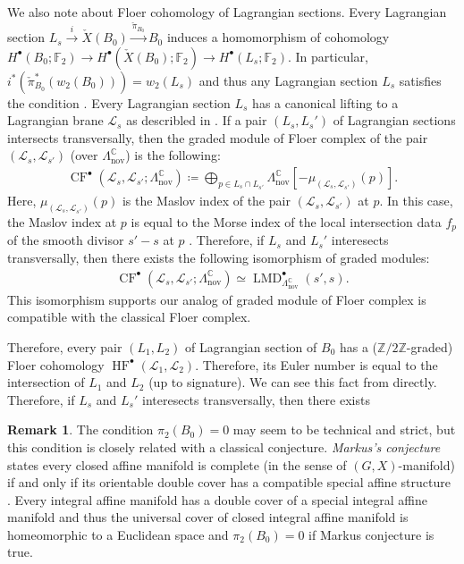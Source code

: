 \documentclass[a4paper,dvipdfmx,reqno,12pt]{amsart}
\makeatletter
\newcommand{\ind}[2]{\emph{#1}\index{1{#2}@{#1}}}
\theoremstyle{definition}
\newtheorem{remark}[theorem]{Remark}
\newcommand{\deq}{\coloneqq}
\newcommand{\opn}[1]{\operatorname{#1}}
\newcommand{\xto}[1]{\xrightarrow{#1}}
\numberwithin{equation}{section}
\makeatother
\begin{document}
We also note about Floer cohomology of 
Lagrangian sections.
Every Lagrangian section
$L_s\xto{i} \check{X}(B_0)\xto{\check{\pi}_{B_0}}  B_0$
induces a homomorphism of 
cohomology 
$H^{\bullet}(B_0;\mathbb{F}_2)\to 
H^{\bullet}(\check{X}(B_0);\mathbb{F}_2)
\to 
H^{\bullet}(L_s;\mathbb{F}_2)$.
In particular, 
$i^{*}(\check{\pi}_{B_0}^{*}(w_2(B_0)))=w_2(L_s)$ and 
thus any Lagrangian section $L_s$ satisfies the 
condition \cite[(2.54)]{MR3656481}.
Every Lagrangian section $L_s$ has 
a canonical lifting to a Lagrangian 
brane $\mathscr{L}_s$ as describled in 
\cite[5.2]{MR1882331}.
If a pair $(L_s,L_s')$ of Lagrangian sections 
intersects transversally, then the graded 
module of Floer complex of the pair
$(\mathscr{L}_s,\mathscr{L}_{s'})$
(over $\Lambda_{\opn{nov}}^{\mathbb{C}}$) 
is the following:
\begin{align}
\opn{CF}^{\bullet}(\mathscr{L}_s,\mathscr{L}_{s'};
\Lambda_{\opn{nov}}^{\mathbb{C}})
\deq \bigoplus_{p\in L_s\cap L_{s'}}
\Lambda_{\opn{nov}}^{\mathbb{C}}
[-\mu_{(\mathscr{L}_s,\mathscr{L}_{s'})}(p)].
\end{align}
Here, $\mu_{(\mathscr{L}_s,\mathscr{L}_{s'})}(p)$ is 
the Maslov index of the pair 
$(\mathscr{L}_s,\mathscr{L}_{s'})$ at $p$.
In this case, the Maslov index at $p$
is equal to the Morse index of the 
local intersection data $f_{p}$ of 
the smooth divisor $s'-s$ at $p$
\cite[Remark 13]{MR1882331}. Therefore, 
if $L_s$ and $L_s'$ interesects 
transversally, then there exists the following
isomorphism of graded modules:
\begin{align}
\opn{CF}^{\bullet}(\mathscr{L}_s,\mathscr{L}_{s'};
\Lambda_{\opn{nov}}^{\mathbb{C}})
\simeq 
\opn{LMD}^{\bullet}_{\Lambda_{\opn{nov}}^{\mathbb{C}}}
(s',s).
\end{align}
This isomorphism supports our analog of graded module
of Floer complex is compatible with the classical 
Floer complex.

Therefore, every pair $(L_1,L_2)$ of Lagrangian section
of $B_0$ has a ($\mathbb{Z}/2\mathbb{Z}$-graded)
Floer cohomology $\opn{HF}^{\bullet}(\mathscr{L}_1,
\mathscr{L}_2)$. 
Therefore, its Euler number is equal to the intersection of 
$L_1$ and $L_2$ (up to signature). We can 
see this fact from \cite[Remark 13]{MR1882331} directly.
Therefore, if $L_s$ and $L_s'$ interesects 
transversally, then there exists 


\begin{remark}
The condition $\pi_2(B_0)=0$ may seem to be technical
and strict, but this condition is 
closely related with a classical conjecture.
\ind{Markus's conjecture}{Markus conjecture} states every closed
affine manifold is complete (in the sense of $(G,X)$-manifold)
if and only if its orientable double cover 
has a compatible special affine structure 
\cite[p.53]{markus1963cosmological}.
Every integral affine manifold has a double cover of 
a special integral affine manifold and thus 
the universal cover of closed integral affine 
manifold is homeomorphic to a Euclidean space and 
$\pi_{2}(B_0)=0$ if Markus conjecture 
is true.
\end{remark}
\end{document}
